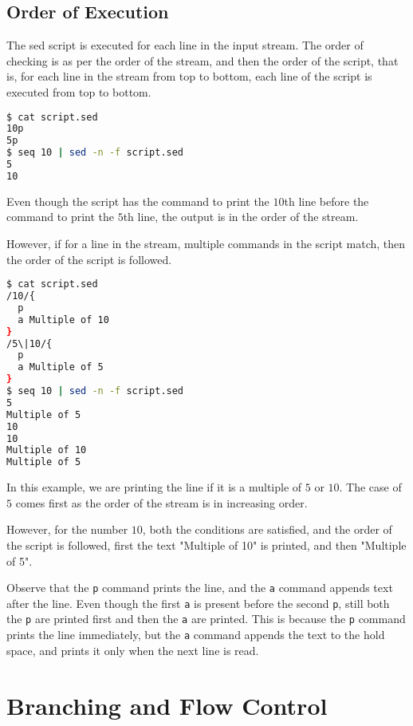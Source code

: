 \subsection{Order of Execution}

The sed script is executed for each line in the input stream.
The order of checking is as per the order of the stream, and then the order of the script, that is, for each line in the stream from top to bottom, each line of the script is executed
from top to bottom.

\begin{lstlisting}[language=bash]
$ cat script.sed
10p
5p
$ seq 10 | sed -n -f script.sed
5
10
\end{lstlisting}

Even though the script has the command to print the $10$th line before the command to print the $5$th line, the output is in the order of the stream.

However, if for a line in the stream, multiple commands in the script match, then the order of the script is followed.

\begin{lstlisting}[language=bash]
$ cat script.sed
/10/{
  p
  a Multiple of 10
}
/5\|10/{
  p
  a Multiple of 5
}
$ seq 10 | sed -n -f script.sed
5
Multiple of 5
10
10
Multiple of 10
Multiple of 5
\end{lstlisting}

In this example, we are printing the line if it is a multiple of $5$ or $10$.
The case of $5$ comes first as the order of the stream is in increasing order.

However, for the number $10$, both the conditions are satisfied, and the order of the script is followed, first the text "Multiple of 10" is printed, and then "Multiple of 5".

\begin{remark}
  Observe that the \lstinline|p| command prints the line, and the \lstinline|a| command appends text after the line. Even though the first \lstinline|a| is present before the second \lstinline|p|, still both the \lstinline|p| are printed first and then the \lstinline|a| are printed.
This is because the \lstinline|p| command prints the line immediately, but the \lstinline|a| command appends the text to the hold space, and prints it only when the next line is read.
\end{remark}

\section{Branching and Flow Control}

